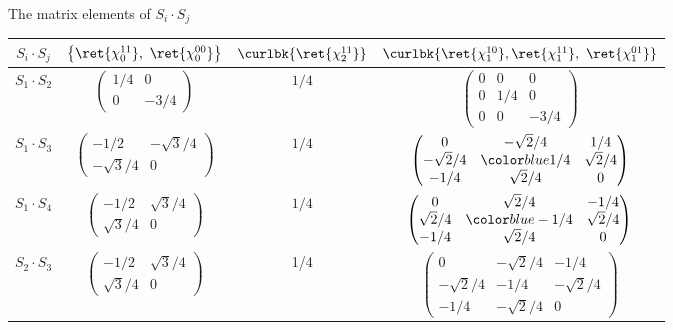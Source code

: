 \begin{frame}{The matrix elements of $S_{i}\cdot S_{j}$}
    \begin{table}[htbp]\tiny
        \begin{tabular}{cccc}
            \toprule[1pt]
            $S_{i}\cdot S_{j}$ & $\left\{\ret{\chi^{11}_{0}},\ \ret{\chi^{00}_{0}}\right\}$ & $\curlbk{\ret{\chi^{11}_{2}}}$ & $\curlbk{\ret{\chi^{10}_{1}},\ret{\chi^{11}_{1}},\ \ret{\chi^{01}_{1}}}$ \\\midrule
            $S_{1}\cdot S_{2}$ & $\begin{pmatrix}1/4 & 0\\0 & -3/4\end{pmatrix}$                               & $1/4$                          & $\begin{pmatrix}0 & 0 & 0\\0 & 1/4 &0\\0&0&-3/4 \end{pmatrix}$                                             \\
            $S_{1}\cdot S_{3}$ & $\begin{pmatrix}-1/2&-\sqrt{3}/4\\-\sqrt{3}/4&0\end{pmatrix}$                               & $1/4$                          & $\begin{pmatrix}0&-\sqrt{2}/4&1/4\\-\sqrt{2}/4&\bluetxt{1/4}&\sqrt{2}/4\\-1/4&\sqrt{2}/4&0\end{pmatrix}$                                             \\
            $S_{1}\cdot S_{4}$ & $\begin{pmatrix}-1/2&\sqrt{3}/4\\\sqrt{3}/4&0 \end{pmatrix}$                               & $1/4$                          & $\begin{pmatrix}0&\sqrt{2}/4&-1/4\\\sqrt{2}/4&\bluetxt{-1/4}&\sqrt{2}/4\\-1/4&\sqrt{2}/4&0\end{pmatrix}$                                             \\
            $S_{2}\cdot S_{3}$ & $\begin{pmatrix}-1/2&\sqrt{3}/4\\\sqrt{3}/4&0\end{pmatrix}$                               & 1/4                            & $\begin{pmatrix}0&-\sqrt{2}/4&-1/4\\-\sqrt{2}/4&-1/4&-\sqrt{2}/4\\-1/4&-\sqrt{2}/4&0\end{pmatrix}$                                             \\

\end{tabular}
\end{table}
\end{frame}
